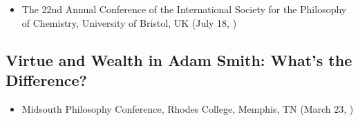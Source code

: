 \documentclass{rhelder3cv}
\begin{document}
\begin{itemize}
  \item The 22nd Annual Conference
    of the International Society for the Philosophy of Chemistry,
    University of Bristol, UK
    (July 18, )
\end{itemize}

\subsection{Virtue and Wealth in Adam Smith: What’s the Difference?}

\begin{itemize}
  \item Midsouth Philosophy Conference,
    Rhodes College, Memphis, TN
    (March 23, )
\end{itemize}
\end{document}
